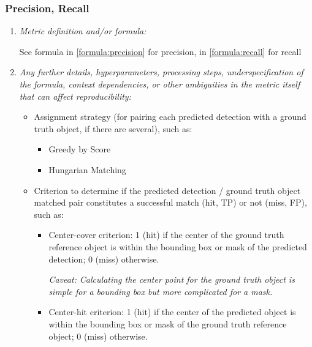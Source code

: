 \documentclass[a4paper,11pt]{article}
\begin{document}
        \subsubsection{Precision, Recall}\label{object_detection:precision-recall}
            \begin{enumerate}[label=\alph*.]
                \item \textit{Metric definition and/or formula:}

                See formula in \ref{formula:precision} for precision, in \ref{formula:recall} for recall
                \bigskip
                \item \textit{Any further details, hyperparameters, processing steps, underspecification of the formula, context dependencies, or other ambiguities in the metric itself that can affect reproducibility:}

                \begin{itemize}
                    \item Assignment strategy (for pairing each predicted detection with a ground truth object, if there are several), such as:
                        \begin{itemize}
                            \item Greedy by Score
                            \item Hungarian Matching
                        \end{itemize}
                    \item Criterion to determine if the predicted detection / ground truth object matched pair constitutes a successful match (hit, TP) or not (miss, FP), such as:
                        \begin{itemize}
                            \item Center-cover criterion: 1 (hit) if the center of the ground truth reference object is within the bounding box or mask of the predicted detection; 0 (miss) otherwise.

                                  \emph{Caveat: Calculating the center point for the ground truth object is simple for a bounding box but more complicated for a mask.}
                            \item Center-hit criterion: 1 (hit) if the center of the predicted object is within the bounding box or mask of the ground truth reference object; 0 (miss) otherwise.


\end{itemize}
\end{itemize}
\end{enumerate}
\end{document}
